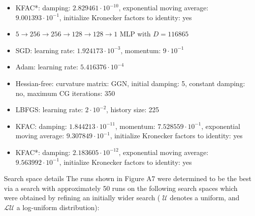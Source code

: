 \documentclass[10pt]{article}
\begin{document}
\begin{itemize}
  \item KFAC*: damping: $2.829461 \cdot 10^{-10}$, exponential moving average: $9.001393 \cdot 10^{-1}$, initialize Kronecker factors to identity: yes
  \item $5 \rightarrow 256 \rightarrow 256 \rightarrow 128 \rightarrow 128 \rightarrow 1$ MLP with $D=116865$
  \item SGD: learning rate: $1.924173 \cdot 10^{-3}$, momentum: $9 \cdot 10^{-1}$
  \item Adam: learning rate: $5.416376 \cdot 10^{-4}$
  \item Hessian-free: curvature matrix: GGN, initial damping: 5, constant damping: no, maximum CG iterations: 350
  \item LBFGS: learning rate: $2 \cdot 10^{-2}$, history size: 225
  \item KFAC: damping: $1.844213 \cdot 10^{-11}$, momentum: $7.528559 \cdot 10^{-1}$, exponential moving average: $9.307849 \cdot 10^{-1}$, initialize Kronecker factors to identity: yes
  \item KFAC*: damping: $2.183605 \cdot 10^{-12}$, exponential moving average: $9.563992 \cdot 10^{-1}$, initialize Kronecker factors to identity: yes
\end{itemize}

Search space details The runs shown in Figure A7 were determined to be the best via a search with approximately 50 runs on the following search spaces which were obtained by refining an initially wider search ( $\mathcal{U}$ denotes a uniform, and $\mathcal{L U}$ a log-uniform distribution):
\end{document}
